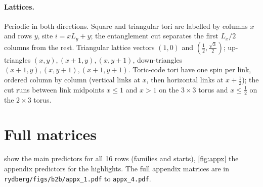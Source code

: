\documentclass[11pt,a4paper]{article}
\begin{document}
\paragraph{Lattices.} Periodic in both directions. Square and triangular tori are labelled by columns $x$ and rows $y$,
site $i=xL_y+y$; the entanglement cut separates the first $L_x/2$ columns from the rest. Triangular lattice vectors
$(1,0)$ and $(\frac12,\frac{\sqrt3}2)$; up-triangles $(x,y),(x+1,y),(x,y+1)$, down-triangles
$(x+1,y),(x,y+1),(x+1,y+1)$. Toric-code tori have one spin per link, ordered column by column (vertical links at $x$,
then horizontal links at $x+\tfrac12$); the cut runs between link midpoints $x\le1$ and $x>1$ on the $3\times3$ torus and
$x\le\frac12$ on the $2\times3$ torus.

\FloatBarrier
\section{Full matrices}
\label{app:full}
 show the main predictors for all 16 rows (families and starts),
\cref{fig:appx} the appendix predictors for the highlights. The full appendix matrices are in
\texttt{rydberg/figs/b2b/appx\_1.pdf} to \texttt{appx\_4.pdf}.
\end{document}
